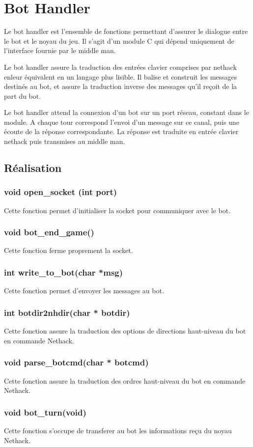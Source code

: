 \section{Bot Handler}

Le bot handler est l'ensemble de fonctions permettant d'assurer le dialogue
entre le bot et le noyau du jeu. Il s'agit d'un module C qui dépend uniquement de l'interface fournie par le middle man.


Le bot handler assure la traduction des entrées clavier comprises par nethack enleur équivalent en un langage plus lisible. Il balise et construit les messages destinés au bot, et assure la traduction inverse des messages qu'il reçoit de la part du bot.


Le bot handler attend la connexion d'un bot sur un port réseau, constant dans le module.
A chaque tour correspond l'envoi d'un message sur ce canal, puis une écoute de la réponse
correspondante. La réponse est traduite en entrée clavier nethack puis transmises au middle man.

\subsection{Réalisation}

\subsubsection*{void open\_socket (int port)}

Cette fonction permet d'initialiser la socket pour communiquer avec le bot.

\subsubsection*{void bot\_end\_game()}

Cette fonction ferme proprement la socket.

\subsubsection*{int write\_to\_bot(char *msg)}

Cette fonction permet d'envoyer les messages au bot.

\subsubsection*{int botdir2nhdir(char * botdir)}

Cette fonction assure la traduction des options de directions haut-niveau du bot en commande Nethack.

\subsubsection*{void parse\_botcmd(char * botcmd)}

Cette fonction assure la traduction des ordres haut-niveau du bot en commande Nethack.

\subsubsection*{void bot\_turn(void)}

Cette fonction s'occupe de transferer au bot les informations reçu du noyau Nethack. 
